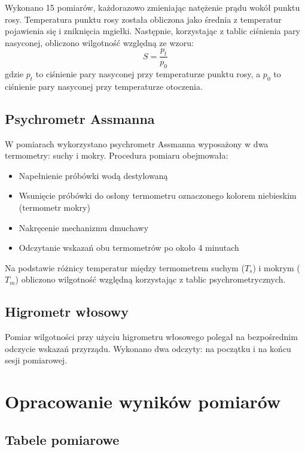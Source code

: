 \documentclass[a4paper,12pt]{article}
\begin{document}
Wykonano 15 pomiarów, każdorazowo zmieniając natężenie prądu wokół punktu rosy. Temperatura punktu rosy została obliczona jako średnia z temperatur pojawienia się i zniknięcia mgiełki. Następnie, korzystając z tablic ciśnienia pary nasyconej, obliczono wilgotność względną ze wzoru:
\begin{equation}
    S = \frac{p_t}{p_0}
\end{equation}
gdzie $p_t$ to ciśnienie pary nasyconej przy temperaturze punktu rosy, a $p_0$ to ciśnienie pary nasyconej przy temperaturze otoczenia.

\subsection{Psychrometr Assmanna}

W pomiarach wykorzystano psychrometr Assmanna wyposażony w dwa termometry: suchy i mokry. Procedura pomiaru obejmowała:
\begin{itemize}
    \item Napełnienie próbówki wodą destylowaną
    \item Wsunięcie próbówki do osłony termometru oznaczonego kolorem niebieskim (termometr mokry)
    \item Nakręcenie mechanizmu dmuchawy
    \item Odczytanie wskazań obu termometrów po około 4 minutach
\end{itemize}

Na podstawie różnicy temperatur między termometrem suchym ($T_s$) i mokrym ($T_m$) obliczono wilgotność względną korzystając z tablic psychrometrycznych.

\subsection{Higrometr włosowy}

Pomiar wilgotności przy użyciu higrometru włosowego polegał na bezpośrednim odczycie wskazań przyrządu. Wykonano dwa odczyty: na początku i na końcu sesji pomiarowej.

\section{Opracowanie wyników pomiarów}

\subsection{Tabele pomiarowe}
\end{document}
